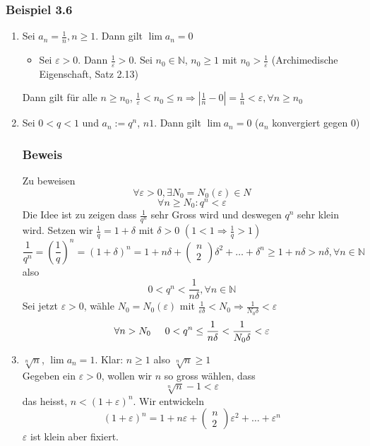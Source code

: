 \subsubsection*{Beispiel 3.6}
\begin{enumerate}
\item Sei $a_n=\frac{1}{n}, n\geq 1$. Dann gilt $\lim a_n=0$ 
\begin{itemize}
\item Sei $\varepsilon>0$. Dann $\frac{1}{\varepsilon}>0$. Sei $n_0\in\mathbb{N}$, $n_0\geq 1$ mit $n_0>\frac{1}{\varepsilon}$ (Archimedische Eigenschaft, Satz 2.13)\\ 
\end{itemize}
Dann gilt für alle $n\geq n_0$, $\frac{1}{\varepsilon}<n_0\leq n \Rightarrow \left| \frac{1}{n}-0\right| = \frac{1}{n}<\varepsilon, \forall n\geq n_0$
\item Sei $0<q<1$ und $a_n:=q^n$, $n 1$. Dann gilt $\lim a_n=0$ ($a_n$ konvergiert gegen 0)
\subsubsection*{Beweis}
Zu beweisen \[\forall \varepsilon > 0, \exists N_0=N_0(\varepsilon)\in N\]\[\forall n\geq N_0:q^n <\varepsilon\]
Die Idee ist zu zeigen dass $\frac{1}{q^n}$ sehr Gross wird und deswegen $q^n$ sehr klein wird. Setzen wir $\frac{1}{q}=1+\delta$ mit $\delta>0$ $\left( 1<1\Rightarrow \frac{1}{q}>1\right)$%
 $$\frac{1}{q^n}=\left( \frac{1}{q}\right)^n=\left( 1+\delta\right)^n=1+n\delta +\left( {\begin{array}{*{20}{c}}
n\\
2
\end{array}} \right) \delta^2+\dots+\delta^n\geq 1+n\delta>n\delta, \forall n\in\mathbb{N}$$
also \[0<q^n<\frac{1}{n\delta}, \forall n\in\mathbb{N}\]
Sei jetzt $\varepsilon >0$, wähle $N_0=N_0(\varepsilon)$ mit $\frac{1}{\varepsilon\delta}<N_0\Rightarrow \frac{1}{N_0\delta}<\varepsilon$
\[\forall n>N_0\hspace{5mm}0<q^n\leq\frac{1}{n\delta}<\frac{1}{N_0\delta}<\varepsilon\]
\item $\sqrt[n]{n}$, $\lim a_n=1$. Klar: $n\geq 1$ also $\sqrt[n]{n}\geq 1$\\
Gegeben ein $\varepsilon>0$, wollen wir $n$ so gross wählen, dass \[\sqrt[n]{n}-1 <\varepsilon\] das heisst, $n<\left( 1+\varepsilon \right)^n$. Wir entwickeln $$\left( 1+\varepsilon\right)^n=1+n\varepsilon+\left( {\begin{array}{*{20}{c}}
n\\
2
\end{array}} \right) \varepsilon^2 + \dots +\varepsilon^n$$
$\varepsilon$ ist klein aber fixiert.\\


\end{enumerate}
